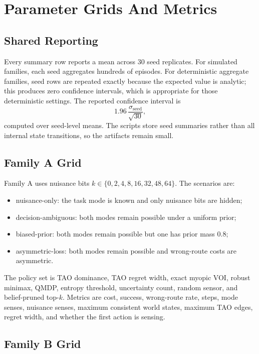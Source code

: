 \documentclass{article}
\begin{document}
\section{Parameter Grids And Metrics}

\subsection{Shared Reporting}

Every summary row reports a mean across 30 seed replicates. For simulated families, each seed aggregates hundreds of episodes. For deterministic aggregate families, seed rows are repeated exactly because the expected value is analytic; this produces zero confidence intervals, which is appropriate for those deterministic settings. The reported confidence interval is
\[
  1.96\,\frac{\sigma_{\mathrm{seed}}}{\sqrt{30}},
\]
computed over seed-level means. The scripts store seed summaries rather than all internal state transitions, so the artifacts remain small.

\subsection{Family A Grid}

Family A uses nuisance bits $k\in\{0,2,4,8,16,32,48,64\}$. The scenarios are:
\begin{itemize}
  \item nuisance-only: the task mode is known and only nuisance bits are hidden;
  \item decision-ambiguous: both modes remain possible under a uniform prior;
  \item biased-prior: both modes remain possible but one has prior mass 0.8;
  \item asymmetric-loss: both modes remain possible and wrong-route costs are asymmetric.
\end{itemize}
The policy set is TAO dominance, TAO regret width, exact myopic VOI, robust minimax, QMDP, entropy threshold, uncertainty count, random sensor, and belief-pruned top-$k$. Metrics are cost, success, wrong-route rate, steps, mode senses, nuisance senses, maximum consistent world states, maximum TAO edges, regret width, and whether the first action is sensing.

\subsection{Family B Grid}
\end{document}
